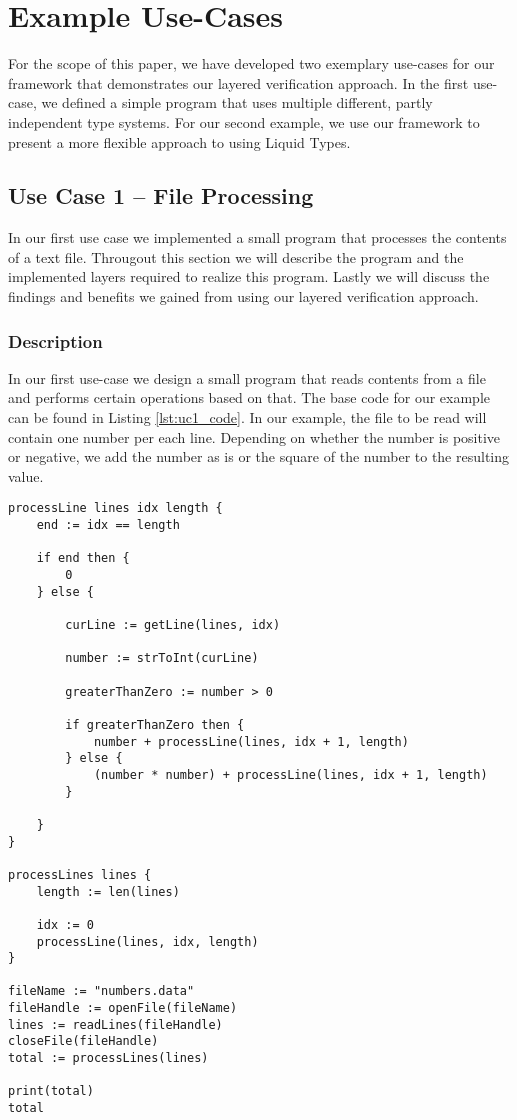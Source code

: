 \section{Example Use-Cases}
\label{ssec:use_cases}
For the scope of this paper, we have developed two exemplary use-cases for our framework that demonstrates our layered verification approach. In the first use-case, we defined a simple program that uses multiple different, partly independent type systems. For our second example, we use our framework to present a more flexible approach to using Liquid Types.

\subsection{Use Case 1 -- File Processing}
\label{sssec:use_case_1}

In our first use case we implemented a small program that processes the contents of a text file. Througout this section we will describe the program and the implemented layers required to realize this program. Lastly we will discuss the findings and benefits we gained from using our layered verification approach.

\subsubsection{Description}
In our first use-case we design a small program that reads contents from a file and performs certain operations based on that. The base code for our example can be found in Listing \ref{lst:uc1_code}. In our example, the file to be read will contain one number per each line. Depending on whether the number is positive or negative, we add the number as is or the square of the number to the resulting value.

\begin{lstlisting}
processLine lines idx length {
    end := idx == length

    if end then {
        0
    } else {

        curLine := getLine(lines, idx)

        number := strToInt(curLine)

        greaterThanZero := number > 0

        if greaterThanZero then {
            number + processLine(lines, idx + 1, length)
        } else {
            (number * number) + processLine(lines, idx + 1, length)
        }

    }
}

processLines lines {
    length := len(lines)

    idx := 0
    processLine(lines, idx, length)
}

fileName := "numbers.data"
fileHandle := openFile(fileName)
lines := readLines(fileHandle)
closeFile(fileHandle)
total := processLines(lines)

print(total)
total

\end{lstlisting}

